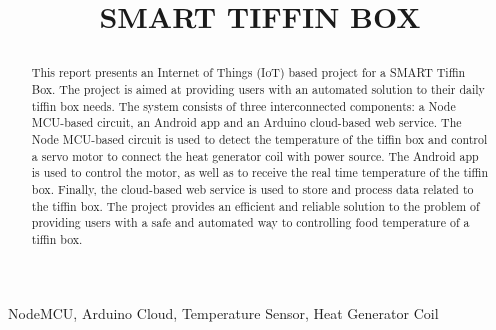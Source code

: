 \documentclass[conference]{IEEEtran}
\begin{document}
\title{SMART TIFFIN BOX\\
\author{


}


}



\maketitle

\begin{abstract}
This report presents an Internet of Things (IoT) based project for a SMART Tiffin Box. The project is aimed at providing users with an automated solution to their daily tiffin box needs. The system consists of three interconnected components: a Node MCU-based circuit, an Android app and an Arduino cloud-based web service. The Node MCU-based circuit is used to detect the temperature of the tiffin box and control a servo motor to connect the heat generator coil with power source. The Android app is used to control the motor, as well as to receive the real time temperature of the tiffin box. Finally, the cloud-based web service is used to store and process data related to the tiffin box. The project provides an efficient and reliable solution to the problem of providing users with a safe and automated way to controlling food temperature of a tiffin box.
\end{abstract}

\begin{IEEEkeywords}
 NodeMCU, Arduino Cloud, Temperature Sensor, Heat Generator Coil
\end{IEEEkeywords}
\end{document}
